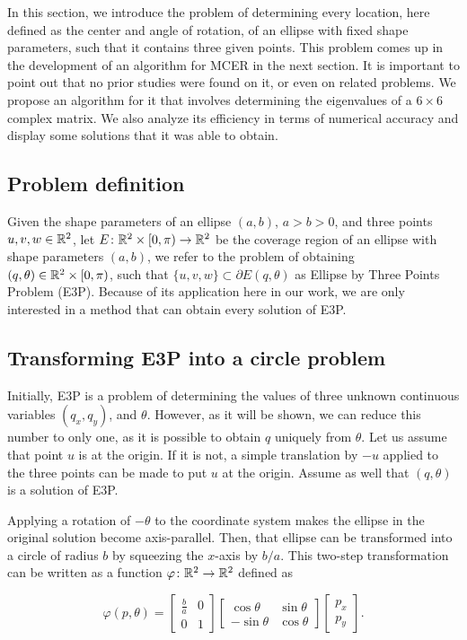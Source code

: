 In this section, we introduce the problem of determining every location, here defined as the center and angle of rotation, of an ellipse with fixed shape parameters, such that it contains three given points.
This problem comes up in the development of an algorithm for MCER in the next section. 
It is important to point out that no prior studies were found on it, or even on related problems.
We propose an algorithm for it that involves determining the eigenvalues of a $6\times6$ complex matrix. We also analyze its efficiency in terms of numerical accuracy and display some solutions that it was able to obtain.

\subsection{Problem definition}

Given the shape parameters of an ellipse $(a, b)$, $a > b >0$, and three points $u, v, w \in \mathbb{R}^2$, let $E\colon \mathbb{R}^2\times [0, \pi)\to\mathbb{R}^2$ be the coverage region of an ellipse with shape parameters $(a, b)$, we refer to the problem of obtaining $(q, \theta) \in \mathbb{R}^2\times [0, \pi)$, such that $\{u, v, w\} \subset \partial E(q, \theta)$ as Ellipse by Three Points Problem (E3P).
Because of its application here in our work, we are only interested in a method that can obtain every solution of E3P.

\subsection{Transforming E3P into a circle problem}

Initially, E3P is a problem of determining the values of three unknown continuous variables $(q_x, q_y)$, and $\theta$. However, as it will be shown, we can reduce this number to only one, as it is possible to obtain $q$ uniquely from $\theta$.
Let us assume that point $u$ is at the origin. If it is not, a simple translation by $-u$ applied to the three points can be made to put $u$ at the origin.
Assume as well that $(q, \theta)$ is a solution of E3P. 

Applying a rotation of $-\theta$ to the coordinate system makes the ellipse in the original solution become axis-parallel.
Then, that ellipse can be transformed into a circle of radius $b$ by squeezing the $x$-axis by $b/a$. This two-step transformation can be written as a function $\varphi\colon \mathbb{R}^2 \to \mathbb{R}^2$ defined as

\begin{equation*}%
\varphi(p, \theta)=\left[\begin{array}{cc}
\frac{b}{a}&0\\
0&1
\end{array}\right]
\left[\begin{array}{cc}
\cos{\theta}&\sin{\theta}\\
-\sin{\theta}&\cos{\theta}
\end{array}\right]\left[\begin{array}{c}
p_x\\
p_y
\end{array}\right].
\end{equation*}

